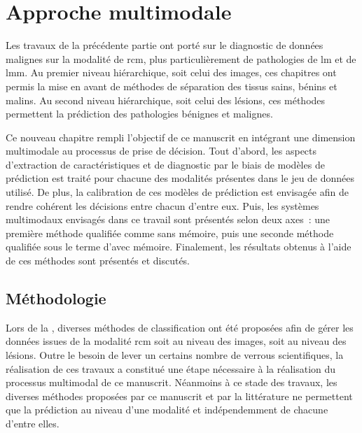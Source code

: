 \renewcommand{\thechapter}{\arabic{chapter}}
\setcounter{chapter}{7}

\chapter{Approche multimodale}
\label{chap:chapter_8}
\chapterintro
Les travaux de la précédente partie ont porté sur le diagnostic de données malignes sur la modalité de \acrlong{rcm}, plus particulièrement de pathologies de \acrlong{lm} et de \acrlong{lmm}. Au premier niveau hiérarchique, soit celui des images, ces chapitres ont permis la mise en avant de méthodes de séparation des tissus sains, bénins et malins. Au second niveau hiérarchique, soit celui des lésions, ces méthodes permettent la prédiction des pathologies bénignes et malignes.\par

Ce nouveau chapitre rempli l'objectif de ce manuscrit en intégrant une dimension multimodale au processus de prise de décision. Tout d'abord, les aspects d'extraction de caractéristiques et de diagnostic par le biais de modèles de prédiction est traité pour chacune des modalités présentes dans le jeu de données utilisé. De plus, la calibration de ces modèles de prédiction est envisagée afin de rendre cohérent les décisions entre chacun d’entre eux. Puis, les systèmes multimodaux envisagés dans ce travail sont présentés selon deux axes~: une première méthode qualifiée comme sans mémoire, puis une seconde méthode qualifiée sous le terme d’avec mémoire. Finalement, les résultats obtenus à l'aide de ces méthodes sont présentés et discutés.\par
\newpage

\section{Méthodologie}
Lors de la , diverses méthodes de classification ont été proposées afin de gérer les données issues de la modalité \gls{rcm} soit au niveau des images, soit au niveau des lésions. Outre le besoin de lever un certains nombre de verrous scientifiques, la réalisation de ces travaux a constitué une étape nécessaire à la réalisation du processus multimodal de ce manuscrit. Néanmoins à ce stade des travaux, les diverses méthodes proposées par ce manuscrit et par la littérature ne permettent que la prédiction au niveau d'une modalité et indépendemment de chacune d'entre elles.\par

